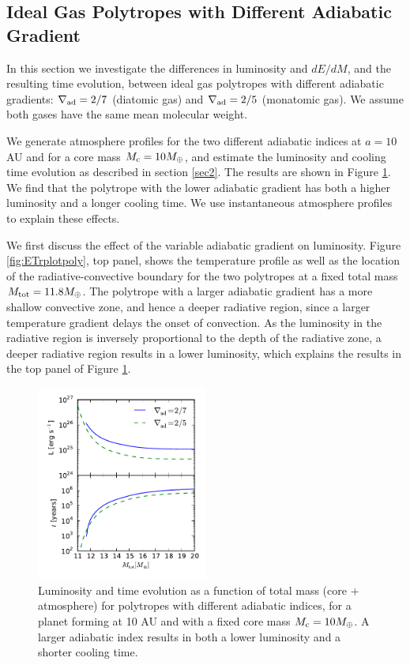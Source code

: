 \documentclass[apj]{emulateapj}
\newcommand{\delad}{\nabla_{\rm ad}}
\begin{document}
\subsection{Ideal Gas Polytropes with Different Adiabatic Gradient}
\label{deladpoly}

In this section we investigate the differences in luminosity and $dE/dM$, and the resulting time evolution, between ideal gas polytropes with different adiabatic gradients: $\delad=2/7$ (diatomic gas) and $\delad=2/5$ (monatomic gas). We assume both gases have the same mean molecular weight. %

We generate atmosphere profiles for the two different adiabatic indices at $a=10$ AU and for a core mass $M_{\rm c}=10 M_{\oplus}$, and estimate the luminosity and cooling time evolution as described in section \ref{sec2}. The results are shown in Figure \ref{fig:Ltplotpoly}. We find that the polytrope with the lower adiabatic gradient has both a higher luminosity and a longer cooling time. We use instantaneous atmosphere profiles to explain these effects. 

We first discuss the effect of the variable adiabatic gradient on luminosity. Figure \ref{fig:ETrplotpoly}, top panel, shows the temperature profile as well as the location of the radiative-convective boundary for the two polytropes at a fixed total mass $M_{\rm{tot}}=11.8 M_{\oplus}$. The polytrope with a larger adiabatic gradient has a more shallow convective zone, and hence a deeper radiative region, since a larger temperature gradient delays the onset of convection. As the luminosity in the radiative region is inversely proportional to the depth of the radiative zone, a deeper radiative region results in a lower luminosity, which explains the results in the top panel of Figure \ref{fig:Ltplotpoly}. 

\begin{figure}[h]
\centering
\includegraphics[width=0.5\textwidth]{../../figs/ModelAtmospheres/RadSelfGravRealEOS/PaperFigs/Ltplot_poly.pdf}
\caption{Luminosity and time evolution as a function of total mass (core + atmosphere) for polytropes with different adiabatic indices, for a planet forming at 10 AU and with a fixed core mass $M_{\rm c}=10 M_{\oplus}$. A larger adiabatic index results in both a lower luminosity and a shorter cooling time.}
\label{fig:Ltplotpoly}
\end{figure}
\end{document}
